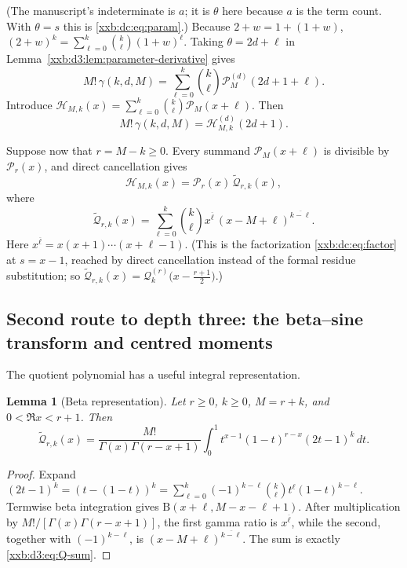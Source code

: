 \documentclass[11pt,a4paper]{article}
\numberwithin{equation}{section}
\newtheorem{lemma}[theorem]{Lemma}
\theoremstyle{definition}
\theoremstyle{remark}
\theoremstyle{plain}
\newcommand{\rise}[2]{#1^{\overline{#2}}}
\begin{document}
(The manuscript's indeterminate is $a$; it is $\theta$ here because $a$ is the
term count.  With $\theta=s$ this is \eqref{xxb:dc:eq:param}.)  Because
$2+w=1+(1+w)$, $(2+w)^k=\sum_{\ell=0}^{k}\binom k\ell(1+w)^\ell$.  Taking
$\theta=2d+\ell$ in Lemma~\ref{xxb:d3:lem:parameter-derivative} gives
\begin{equation}
 \label{xxb:d3:eq:gamma-H}
 M!\,\gamma(k,d,M)
 =\sum_{\ell=0}^{k}\binom k\ell \mathcal P_M^{(d)}(2d+1+\ell).
\end{equation}
Introduce $\mathcal H_{M,k}(x)=\sum_{\ell=0}^{k}\binom k\ell\mathcal P_M(x+\ell)$.
Then
\begin{equation}
 \label{xxb:d3:eq:H-derivative}
 M!\,\gamma(k,d,M)=\mathcal H_{M,k}^{(d)}(2d+1).
\end{equation}

Suppose now that $r=M-k\geq0$.  Every summand $\mathcal P_M(x+\ell)$ is
divisible by $\mathcal P_r(x)$, and direct cancellation gives
\begin{equation}
 \label{xxb:d3:eq:H-factorization}
 \mathcal H_{M,k}(x)=\mathcal P_r(x)\,\widetilde{\mathcal Q}_{r,k}(x),
\end{equation}
where
\begin{equation}
 \label{xxb:d3:eq:Q-sum}
 \widetilde{\mathcal Q}_{r,k}(x)=\sum_{\ell=0}^{k}\binom k\ell
 \rise{x}{\ell}\,\rise{(x-M+\ell)}{k-\ell}.
\end{equation}
Here $\rise{x}{\ell}=x(x+1)\cdots(x+\ell-1)$.  (This is the factorization
\eqref{xxb:dc:eq:factor} at $s=x-1$, reached by direct cancellation instead of
the formal residue substitution; so $\widetilde{\mathcal Q}_{r,k}(x)
=\mathcal Q_k^{(r)}\bigl(x-\frac{r+1}2\bigr)$.)

\subsection{Second route to depth three: the beta--sine transform and centred moments}\label{xxb:d3:sec:beta-sine}

The quotient polynomial has a useful integral representation.

\begin{lemma}[Beta representation]
\label{xxb:d3:lem:beta-Q}
Let $r\geq0$, $k\geq0$, $M=r+k$, and $0<\Re x<r+1$.  Then
\[
 \widetilde{\mathcal Q}_{r,k}(x)
 =\frac{M!}{\Gamma(x)\Gamma(r-x+1)}
 \int_0^1t^{x-1}(1-t)^{r-x}(2t-1)^k\,dt.
\]
\end{lemma}

\begin{proof}
Expand
$(2t-1)^k=(t-(1-t))^k=\sum_{\ell=0}^{k}(-1)^{k-\ell}\binom k\ell t^\ell(1-t)^{k-\ell}$.
Termwise beta integration gives $\mathrm B(x+\ell,M-x-\ell+1)$.  After
multiplication by $M!/[\Gamma(x)\Gamma(r-x+1)]$, the first gamma ratio is
$\rise{x}{\ell}$, while the second, together with $(-1)^{k-\ell}$, is
$\rise{(x-M+\ell)}{k-\ell}$.  The sum is exactly \eqref{xxb:d3:eq:Q-sum}.
\end{proof}
\end{document}
